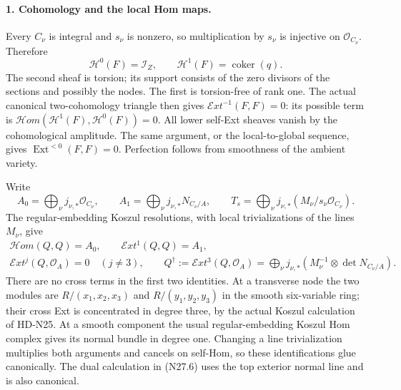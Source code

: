 \paragraph{1. Cohomology and the local Hom maps.}
Every $C_\nu$ is integral and $s_\nu$ is nonzero, so
multiplication by $s_\nu$ is injective on
$\mathcal O_{C_\nu}$. Therefore
\[
           \mathcal H^0(F)=\mathcal I_Z,\qquad
           \mathcal H^1(F)=\operatorname{coker}(q).       \tag{N27.4}
\]
The second sheaf is torsion; its support consists of the
zero divisors of the sections and possibly the nodes.
The first is torsion-free of rank one. The actual canonical
two-cohomology triangle then gives
$\mathcal E xt^{-1}(F,F)=0$: its possible term is
$\mathcal H om(\mathcal H^1(F),\mathcal H^0(F))=0$.
All lower self-Ext sheaves vanish by the cohomological
amplitude. The same argument, or the local-to-global
sequence, gives $\operatorname{Ext}^{<0}(F,F)=0$.
Perfection follows from smoothness of the ambient variety.

Write
\[
 A_0=\bigoplus_\nu j_{\nu,*}\mathcal O_{C_\nu},\qquad
 A_1=\bigoplus_\nu j_{\nu,*}N_{C_\nu/A},\qquad
 T_s=\bigoplus_\nu j_{\nu,*}
                         (M_\nu/s_\nu\mathcal O_{C_\nu}).
                                                               \tag{N27.5}
\]
The regular-embedding Koszul resolutions, with local
trivializations of the lines $M_\nu$, give
\[
 \begin{gathered}
 \mathcal H om(Q,Q)=A_0,\qquad
 \mathcal E xt^1(Q,Q)=A_1,\\
 \mathcal E xt^j(Q,\mathcal O_A)=0\quad(j\ne3),
 \qquad Q^\dagger:=\mathcal E xt^3(Q,\mathcal O_A)
   =\bigoplus_\nu j_{\nu,*}
                         (M_\nu^{-1}\otimes\det N_{C_\nu/A}).
 \end{gathered}                                               \tag{N27.6}
\]
There are no cross terms in the first two identities.
At a transverse node the two modules are
$R/(x_1,x_2,x_3)$ and $R/(y_1,y_2,y_3)$ in the smooth
six-variable ring; their cross Ext is concentrated in
degree three, by the actual Koszul calculation of HD-N25.
At a smooth component the usual regular-embedding Koszul
Hom complex gives its normal bundle in degree one.
Changing a line trivialization multiplies both arguments
and cancels on self-Hom, so these identifications glue
canonically. The dual calculation in (N27.6) uses the
top exterior normal line and is also canonical.

